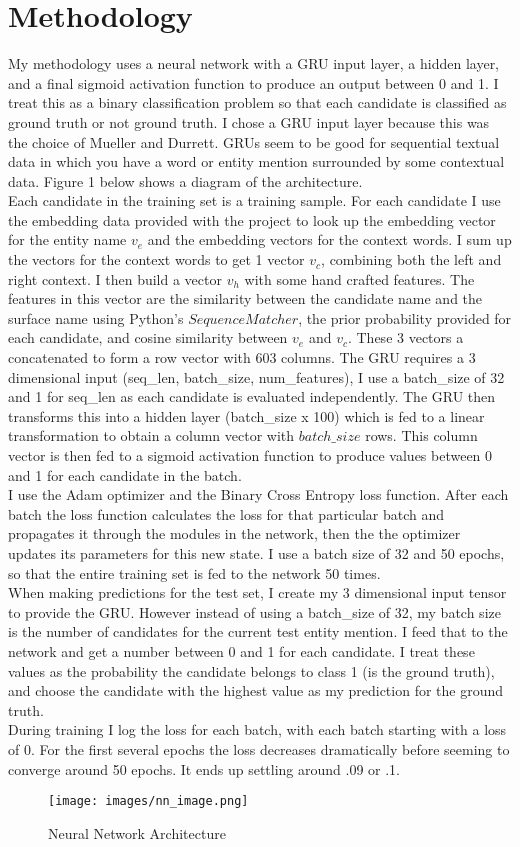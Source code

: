 \documentclass{article}
\begin{document}
\section{Methodology}
My methodology uses a neural network with a GRU input layer, a hidden layer, and a final sigmoid activation function to produce an output between 0 and 1.  I treat this as a binary classification problem so that each candidate is classified as ground truth or not ground truth.  I chose a GRU input layer because this was the choice of Mueller and Durrett.  GRUs seem to be good for sequential textual data in which you have a word or entity mention surrounded by some contextual data.  Figure 1 below shows a diagram of the architecture.\\
Each candidate in the training set is a training sample.  For each candidate I use the embedding data provided with the project to look up the embedding vector for the entity name $v_e$ and the embedding vectors for the context words.  I sum up the vectors for the context words to get 1 vector $v_c$, combining both the left and right context.  I then build a vector $v_h$ with some hand crafted features.  The features in this vector are the similarity between the candidate name and the surface name using Python's $SequenceMatcher$, the prior probability provided for each candidate, and cosine similarity between $v_e$ and $v_c$.  These 3 vectors a concatenated to form a row vector with 603 columns.  The GRU requires a 3 dimensional input (seq\_len, batch\_size, num\_features), I use a batch\_size of 32 and 1 for seq\_len as each candidate is evaluated independently.  The GRU then transforms this into a hidden layer (batch\_size x 100) which is fed to a linear transformation to obtain a column vector with $batch\_size$ rows.  This column vector is then fed to a sigmoid activation function to produce values between 0 and 1 for each candidate in the batch.\\
I use the Adam optimizer and the Binary Cross Entropy loss function.  After each batch the loss function calculates the loss for that particular batch and propagates it through the modules in the network, then the the optimizer updates its parameters for this new state. I use a batch size of 32 and 50 epochs, so that the entire training set is fed to the network 50 times.\\
When making predictions for the test set, I create my 3 dimensional input tensor to provide the GRU.  However instead of using a batch\_size of 32, my batch size is the number of candidates for the current test entity mention.  I feed that to the network and get a number between 0 and 1 for each candidate.  I treat these values as the probability the candidate belongs to class 1 (is the ground truth), and choose the candidate with the highest value as my prediction for the ground truth.\\
During training I log the loss for each batch, with each batch starting with a loss of 0.  For the first several epochs the loss decreases dramatically before seeming to converge around 50 epochs.  It ends up settling around .09 or .1.\\
\begin{figure}
\centering
\texttt{[image: images/nn\_image.png]}
\caption{Neural Network Architecture}
\end{figure}
\end{document}
